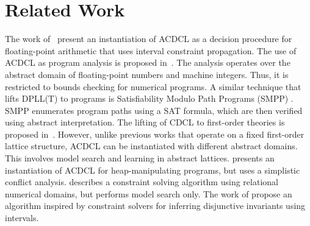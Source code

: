 \section{Related Work}
The work of~\cite{sas13,DBLP:journals/fmsd/BrainDGHK14} present an
instantiation of ACDCL as a decision procedure for floating-point
arithmetic that uses interval constraint propagation.  
%
The use of
ACDCL as program analysis is proposed in~\cite{tacas12}.  The analysis
operates over the abstract domain of floating-point numbers and
machine integers.  Thus, it is restricted to bounds checking for
numerical programs.  
%
A similar technique that lifts DPLL(T) to
programs is Satisfiability Modulo Path Programs (SMPP) \cite{SMPP}. SMPP
enumerates program paths using a SAT formula, which are then verified
using abstract interpretation.  
%
The lifting of CDCL to first-order theories is proposed
in~\cite{dpll,cp09,ndsmt}.
%
 However, unlike
previous works that operate on a fixed first-order lattice structure,
ACDCL can be instantiated with different abstract domains.  This
involves model search and learning in abstract lattices.   
%
\cite{DBLP:journals/fmsd/BrainDGHK14} presents an instantiation of ACDCL for
heap-manipulating programs, but uses a simplistic conflict analysis.
%
\cite{DBLP:conf/vmcai/PelleauMTB13} describes a constraint solving algorithm
using relational numerical domains, but performs model search only.
%
The work of \cite{DBLP:conf/esop/MineBR16} propose an algorithm inspired by constraint
solvers for inferring disjunctive invariants using intervals.
%

